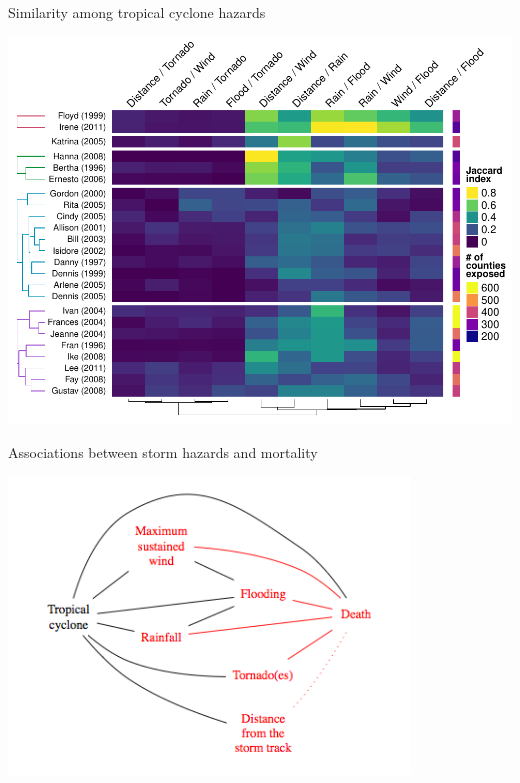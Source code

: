 \documentclass[ignorenonframetext,]{beamer}
\begin{document}
\begin{frame}{Similarity among tropical cyclone hazards}

\begin{center}\includegraphics[width=\textwidth]{figures/jaccard_heatmap_presentation} \end{center}

\end{frame}

\begin{frame}{Associations between storm hazards and mortality}

\begin{center}\includegraphics[width=0.8\textwidth]{figures/metric_associations_with_mortality} \end{center}

\end{frame}
\end{document}
